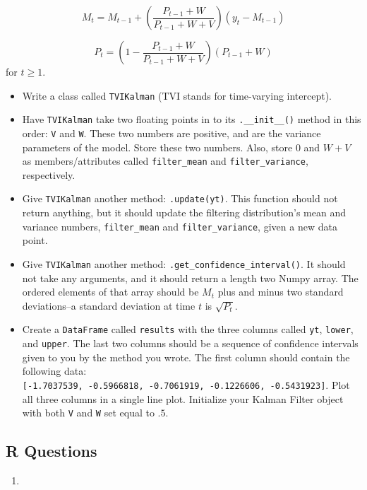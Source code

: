 \documentclass[
  12pt,
  krantz2]{krantz}
\providecommand{\tightlist}{%
  \setlength{\itemsep}{0pt}\setlength{\parskip}{0pt}}
\begin{document}
\[
M_t = M_{t-1} + \left(\frac{P_{t-1} + W}{P_{t-1} + W+V} \right)(y_t - M_{t-1}) 
\]

\[
P_t = \left(1 - \frac{P_{t-1} + W}{P_{t-1} + W+V} \right)(P_{t-1} + W)
\]
for \(t \ge 1\).

\begin{itemize}
\tightlist
\item
  Write a class called \texttt{TVIKalman} (TVI stands for time-varying intercept).
\item
  Have \texttt{TVIKalman} take two floating points in to its \texttt{.\_\_init\_\_()} method in this order: \texttt{V} and \texttt{W}. These two numbers are positive, and are the variance parameters of the model. Store these two numbers. Also, store \(0\) and \(W+V\) as members/attributes called \texttt{filter\_mean} and \texttt{filter\_variance}, respectively.
\item
  Give \texttt{TVIKalman} another method: \texttt{.update(yt)}. This function should not return anything, but it should update the filtering distribution's mean and variance numbers, \texttt{filter\_mean} and \texttt{filter\_variance}, given a new data point.
\item
  Give \texttt{TVIKalman} another method: \texttt{.get\_confidence\_interval()}. It should not take any arguments, and it should return a length two Numpy array. The ordered elements of that array should be \(M_t\) plus and minus two standard deviations--a standard deviation at time \(t\) is \(\sqrt{P_t}\).
\item
  Create a \texttt{DataFrame} called \texttt{results} with the three columns called \texttt{yt}, \texttt{lower}, and \texttt{upper}. The last two columns should be a sequence of confidence intervals given to you by the method you wrote. The first column should contain the following data: \texttt{{[}-1.7037539,\ -0.5966818,\ -0.7061919,\ -0.1226606,\ -0.5431923{]}}. Plot all three columns in a single line plot. Initialize your Kalman Filter object with both \texttt{V} and \texttt{W} set equal to \(.5\).
\end{itemize}

\hypertarget{r-questions-10}{%
\subsection{R Questions}\label{r-questions-10}}

\begin{enumerate}
\def\labelenumi{\arabic{enumi}.}
\tightlist
\item
\end{enumerate}
\end{document}
